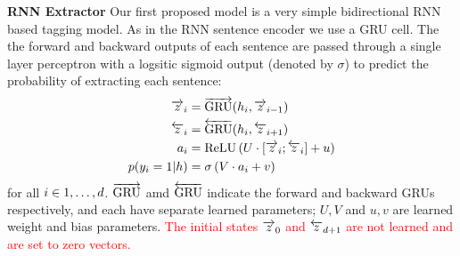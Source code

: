 \textbf{RNN Extractor} Our first proposed model is a very simple bidirectional
RNN based tagging model. As in the RNN sentence encoder we use a GRU cell.
The the forward and backward outputs of each sentence are passed through a 
single layer perceptron with a logsitic sigmoid output (denoted by $\sigma$)
to predict the probability
of extracting each sentence:
\begin{align}
    \overrightarrow{z}_i &= \overrightarrow{\operatorname{GRU}}(h_i, \overrightarrow{z}_{i-1}) \\
   \overleftarrow{z}_i &= \overleftarrow{\operatorname{GRU}}(h_i, \overleftarrow{z}_{i+1}) \\
   a_i &= \operatorname{ReLU}\left(U \cdot [\overrightarrow{z}_i; \overleftarrow{z}_i] + u \right)\\
   p(y_i=1|h) &= \sigma\left(V\cdot a_i + v  \right)
\end{align}
for all $i \in 1, \ldots, d$. $\overrightarrow{\operatorname{GRU}}$ amd $\overleftarrow{\operatorname{GRU}}$ indicate the 
forward and backward GRUs respectively, and each have separate learned 
parameters; $U, V$ and $u, v$ are learned weight and bias parameters.
\textcolor{red}{The initial states $\overrightarrow{z}_0$ and $\overleftarrow{z}_{d + 1}$ are not 
learned and are set to zero vectors.}



